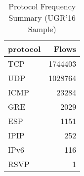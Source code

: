 \begin{table}
\caption{Protocol Frequency Summary (UGR'16 Sample)}
\label{tab:ugr16_protocol_summary}
\begin{tabular}{lr}
\toprule
protocol & Flows \\
\midrule
TCP & 1744403 \\
UDP & 1028764 \\
ICMP & 23284 \\
GRE & 2029 \\
ESP & 1151 \\
IPIP & 252 \\
IPv6 & 116 \\
RSVP & 1 \\
\bottomrule
\end{tabular}
\end{table}

